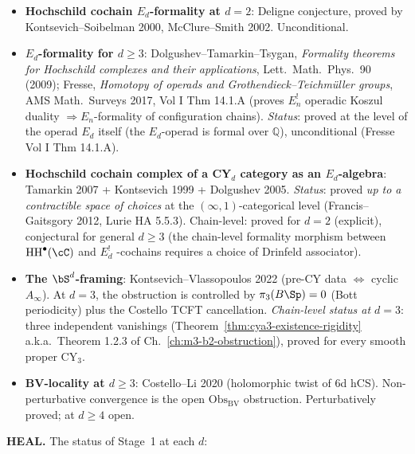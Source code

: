 \documentclass[11pt]{article}
\theoremstyle{definition}
\providecommand{\HH}{\mathrm{HH}}
\providecommand{\Ainf}{A_\infty}
\begin{document}
\smallskip
\begin{itemize}[leftmargin=*]
\item \textbf{Hochschild cochain $E_d$-formality at $d = 2$}: Deligne
conjecture, proved by Kontsevich--Soibelman 2000, McClure--Smith 2002.
Unconditional.

\item \textbf{$E_d$-formality for $d \geq 3$}: Dolgushev--Tamarkin--Tsygan,
\emph{Formality theorems for Hochschild complexes and their
applications}, Lett.\ Math.\ Phys.\ 90 (2009); Fresse,
\emph{Homotopy of operads and Grothendieck--Teichm\"uller groups}, AMS
Math.\ Surveys 2017, Vol I Thm 14.1.A (proves $E_n^!$ operadic
Koszul duality $\Rightarrow E_n$-formality of configuration chains).
\emph{Status}: proved at the level of the operad $E_d$ itself (the
$E_d$-operad is formal over $\mathbb Q$), unconditional
(Fresse Vol I Thm 14.1.A).

\item \textbf{Hochschild cochain complex of a CY$_d$ category as an
$E_d$-algebra}: Tamarkin 2007 + Kontsevich 1999 + Dolgushev 2005.
\emph{Status}: proved \emph{up to a contractible space of choices} at
the $(\infty,1)$-categorical level (Francis--Gaitsgory 2012, Lurie HA
5.5.3). Chain-level: proved for $d = 2$ (explicit), conjectural for
general $d \geq 3$ (the chain-level formality morphism between
$\HH^\bullet(\cC)$ and $E_d^!$ -cochains requires a choice of
Drinfeld associator).

\item \textbf{The $\bS^d$-framing}: Kontsevich--Vlassopoulos 2022 (pre-CY
data $\Leftrightarrow$ cyclic $\Ainf$). At $d = 3$, the obstruction is
controlled by $\pi_3(B\Sp) = 0$ (Bott periodicity) plus the
Costello TCFT cancellation. \emph{Chain-level status at $d = 3$}: three
independent vanishings (Theorem~\ref{thm:cya3-existence-rigidity}
a.k.a.\ Theorem 1.2.3 of Ch.~\ref{ch:m3-b2-obstruction}), proved for
every smooth proper CY$_3$.

\item \textbf{BV-locality at $d \geq 3$}: Costello--Li 2020 (holomorphic
twist of 6d hCS). Non-perturbative convergence is the open
$\mathrm{Obs}_{\mathrm{BV}}$ obstruction. Perturbatively proved; at
$d \geq 4$ open.
\end{itemize}

\smallskip
\noindent\textbf{HEAL.} The status of Stage~1 at each $d$:
\end{document}
